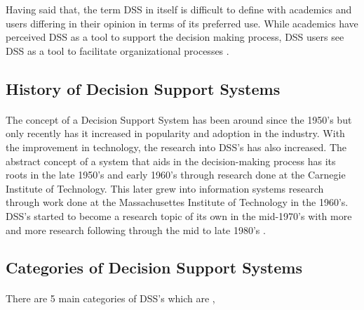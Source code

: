 Having said that, the term DSS in itself is difficult to define with academics and users differing in their opinion in terms of its preferred use. While academics have perceived DSS as a tool to support the decision making process, DSS users see DSS as a tool to facilitate organizational processes \cite{Keen1980}.

\subsection{History of Decision Support Systems}

\paragraph{ } The concept of a Decision Support System has been around since the 1950's but only recently has it increased in popularity and adoption in the industry. With the improvement in technology, the research into DSS's has also increased. The abstract concept of a system that aids in the decision-making process has its roots in the late 1950's and early 1960's through research done at the Carnegie Institute of Technology. This later grew into information systems research through work done at the Massachusettes Institute of Technology in the 1960's. DSS's started to become a research topic of its own in the mid-1970's with more and more research following through the mid to late 1980's \cite{Keen1980, Power2003}.

\subsection{Categories of Decision Support Systems}

\paragraph{} There are 5 main categories of DSS's which are \cite{Power2003},

